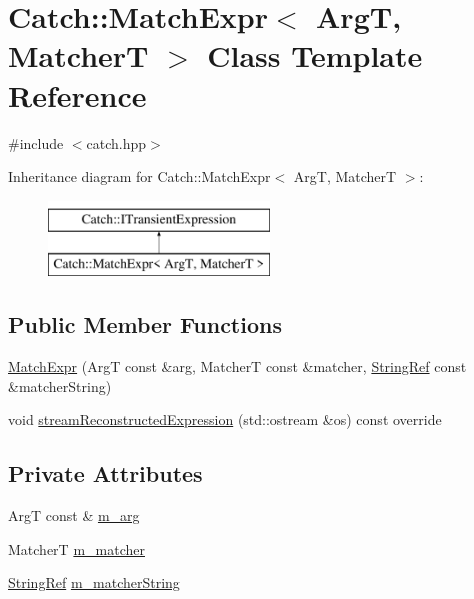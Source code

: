 \hypertarget{class_catch_1_1_match_expr}{}\section{Catch\+::Match\+Expr$<$ ArgT, MatcherT $>$ Class Template Reference}
\label{class_catch_1_1_match_expr}


{\ttfamily \#include $<$catch.\+hpp$>$}

Inheritance diagram for Catch\+::Match\+Expr$<$ ArgT, MatcherT $>$\+:\begin{figure}[H]
\begin{center}
\leavevmode
\includegraphics[height=2.000000cm]{class_catch_1_1_match_expr}
\end{center}
\end{figure}
\subsection*{Public Member Functions}
\begin{DoxyCompactItemize}
\item 
\mbox{\hyperlink{class_catch_1_1_match_expr_ae55ee9bf46c8676c65e9df291a98c345}{Match\+Expr}} (ArgT const \&arg, MatcherT const \&matcher, \mbox{\hyperlink{class_catch_1_1_string_ref}{String\+Ref}} const \&matcher\+String)
\item 
void \mbox{\hyperlink{class_catch_1_1_match_expr_ad3e41adb597750b2219bb37e51185629}{stream\+Reconstructed\+Expression}} (std\+::ostream \&os) const override
\end{DoxyCompactItemize}
\subsection*{Private Attributes}
\begin{DoxyCompactItemize}
\item 
ArgT const  \& \mbox{\hyperlink{class_catch_1_1_match_expr_afb77e2fbf49f956d27f8617a70cf7118}{m\+\_\+arg}}
\item 
MatcherT \mbox{\hyperlink{class_catch_1_1_match_expr_a4dea78586dd2b3268b4a186e7c0adbe2}{m\+\_\+matcher}}
\item 
\mbox{\hyperlink{class_catch_1_1_string_ref}{String\+Ref}} \mbox{\hyperlink{class_catch_1_1_match_expr_a33ec706994f744ff1f4a549177ec08f9}{m\+\_\+matcher\+String}}
\end{DoxyCompactItemize}
